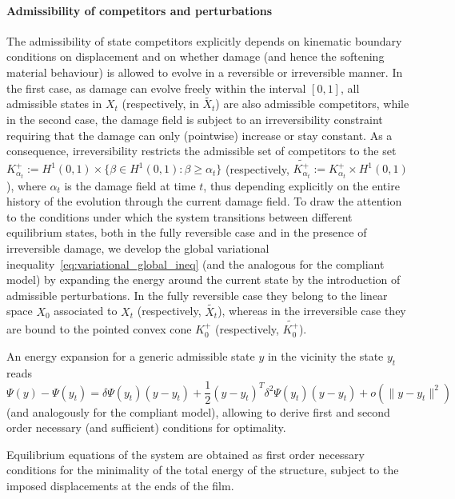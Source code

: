 \paragraph{Admissibility of competitors and perturbations}
The admissibility of state competitors explicitly depends on kinematic boundary conditions on displacement and on whether damage (and hence the softening material behaviour) is allowed to evolve in a reversible or irreversible manner.
In the first case, as damage can evolve freely within the interval $[0, 1]$, all admissible states in $X_t$  (respectively, in $\widetilde{X_t}$) are also admissible competitors, 
while in the second case, the damage field is subject to an irreversibility constraint requiring that the damage can only (pointwise) increase or stay constant. 
As a consequence, irreversibility restricts the admissible set of competitors to the set $K^+_{\alpha_t}:=H^1(0, 1) \times \{\beta\in H^1(0, 1): \beta\geq \alpha_t\}$ (respectively, $\widetilde{K^+_{\alpha_t}}:=K^+_{\alpha_t}\times H^1(0, 1)$), where $\alpha_t$ is the damage field at time $t$, thus depending explicitly on the entire history of the evolution through the current damage field.
To draw the attention to the conditions under which the system transitions between different equilibrium states, both in the fully reversible case and in the presence of irreversible damage, we develop the global variational inequality~\eqref{eq:variational_global_ineq} (and the analogous for the compliant model) by expanding the energy around the current state by the  introduction of admissible perturbations. 
In the fully reversible case they belong to the linear space $X_0$ associated to $X_t$ (respectively, $\widetilde{X_t}$), whereas in the irreversible case they are bound to the pointed convex cone $K^+_0$ (respectively, $\widetilde{K^+_0}$).

An energy expansion for a generic admissible state $y$ in the vicinity the state $y_t$ reads
$$
\Psi(y)-\Psi(y_t)= \delta\Psi(y_t)(y-y_t)+\frac{1}{2}(y-y_t)^T \delta^2\Psi(y_t)(y-y_t)+o(\|y-y_t\|^2)
    \label{eqn:energy-expansion}
$$
(and analogously for the compliant model), allowing to derive first and second order necessary (and sufficient) conditions for optimality.

Equilibrium equations of the system are obtained as first order necessary conditions for the minimality of the total energy of the structure, subject to the imposed displacements at the ends of the film.

